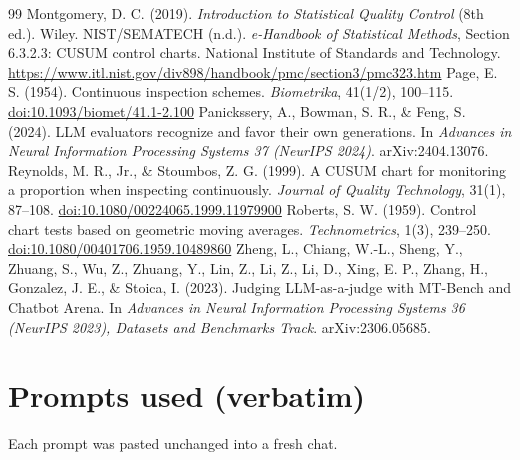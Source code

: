 \documentclass[11pt]{article}
\newcommand{\doi}[1]{\href{https://doi.org/#1}{doi:#1}}
\begin{document}
\begin{thebibliography}{99}
 Montgomery, D. C. (2019). \emph{Introduction to Statistical Quality Control} (8th ed.). Wiley.
 NIST/SEMATECH (n.d.). \emph{e-Handbook of Statistical Methods}, Section 6.3.2.3: CUSUM control charts. National Institute of Standards and Technology. \url{https://www.itl.nist.gov/div898/handbook/pmc/section3/pmc323.htm}
 Page, E. S. (1954). Continuous inspection schemes. \emph{Biometrika}, 41(1/2), 100--115. \doi{10.1093/biomet/41.1-2.100}
 Panickssery, A., Bowman, S. R., \& Feng, S. (2024). LLM evaluators recognize and favor their own generations. In \emph{Advances in Neural Information Processing Systems 37 (NeurIPS 2024)}. arXiv:2404.13076.
 Reynolds, M. R., Jr., \& Stoumbos, Z. G. (1999). A CUSUM chart for monitoring a proportion when inspecting continuously. \emph{Journal of Quality Technology}, 31(1), 87--108. \doi{10.1080/00224065.1999.11979900}
 Roberts, S. W. (1959). Control chart tests based on geometric moving averages. \emph{Technometrics}, 1(3), 239--250. \doi{10.1080/00401706.1959.10489860}
 Zheng, L., Chiang, W.-L., Sheng, Y., Zhuang, S., Wu, Z., Zhuang, Y., Lin, Z., Li, Z., Li, D., Xing, E. P., Zhang, H., Gonzalez, J. E., \& Stoica, I. (2023). Judging LLM-as-a-judge with MT-Bench and Chatbot Arena. In \emph{Advances in Neural Information Processing Systems 36 (NeurIPS 2023), Datasets and Benchmarks Track}. arXiv:2306.05685.
\end{thebibliography}

\appendix
\section{Prompts used (verbatim)}\label{app:prompts}
Each prompt was pasted unchanged into a fresh chat.
\end{document}
